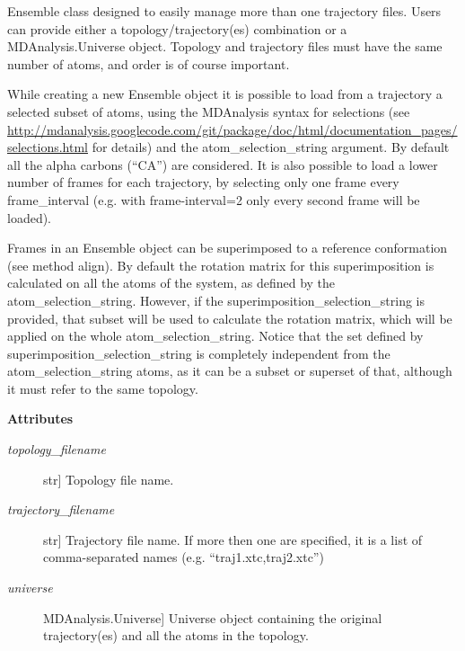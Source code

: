 \documentclass[letterpaper,10pt,english]{sphinxmanual}
\begin{document}
\begin{fulllineitems}
\label{index:encore.Ensemble.Ensemble}
Ensemble class designed to easily manage more than one trajectory files. Users can provide either a topology/trajectory(es) combination or a MDAnalysis.Universe object. Topology and trajectory files must have the same number of atoms, and order is of course important.

While creating a new Ensemble object it is possible to load from a trajectory a selected subset of atoms, using the MDAnalysis syntax for selections (see \href{http://mdanalysis.googlecode.com/git/package/doc/html/documentation\_pages/selections.html}{http://mdanalysis.googlecode.com/git/package/doc/html/documentation\_pages/selections.html} for details) and the atom\_selection\_string argument. By default all the alpha carbons (``CA'') are considered. It is also possible to load a lower number of frames for each trajectory, by selecting only one frame every frame\_interval (e.g. with frame-interval=2 only every second frame will be loaded).

Frames in an Ensemble object can be superimposed to a reference conformation (see method align). By default the rotation matrix for this superimposition is calculated on all the atoms of the system, as defined by the atom\_selection\_string. However, if the superimposition\_selection\_string is provided, that subset will be used to calculate the rotation matrix, which will be applied on the whole atom\_selection\_string. Notice that the set defined by superimposition\_selection\_string is completely independent from the atom\_selection\_string atoms, as it can be a subset or superset of that, although it must refer to the same topology.

\textbf{Attributes}
\begin{description}
\item[{\emph{topology\_filename}}] \leavevmode{[}str{]}
Topology file name.

\item[{\emph{trajectory\_filename}}] \leavevmode{[}str{]}
Trajectory file name. If more then one are specified, it is a list of comma-separated names (e.g. ``traj1.xtc,traj2.xtc'')

\item[{\emph{universe}}] \leavevmode{[}MDAnalysis.Universe{]}
Universe object containing the original trajectory(es) and all the atoms in the topology.


\end{description}
\end{fulllineitems}
\end{document}
